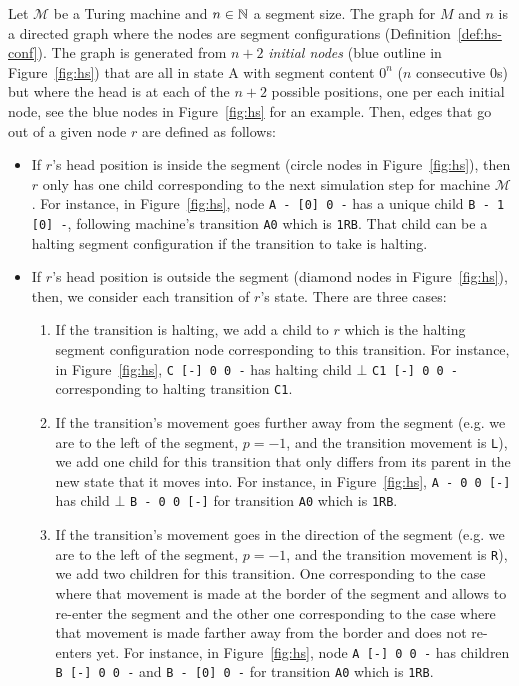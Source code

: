 \begin{definition}[\HS graph]\label{def:hs-graph}\normalfont
  Let $\mathcal{M}$ be a Turing machine and $n \in \mathbb{N}$ a segment size. The \HS graph for $M$ and $n$ is a directed graph where the nodes are segment configurations (Definition~\ref{def:hs-conf}). The graph is generated from $n+2$ \textit{initial nodes} (blue outline in Figure~\ref{fig:hs}) that are all in state A with segment content $0^n$ ($n$ consecutive 0s) but where the head is at each of the $n+2$ possible positions, one per each initial node, see the blue nodes in Figure~\ref{fig:hs} for an example.
  Then, edges that go out of a given node $r$ are defined as follows:
  \begin{itemize}
    \item If $r$'s head position is inside the segment (circle nodes in Figure~\ref{fig:hs}), then $r$ only has one child corresponding to the next simulation step for machine $\mathcal{M}$. For instance, in Figure~\ref{fig:hs}, node \texttt{A - [0] 0 -} has a unique child \texttt{B - 1 [0] -}, following machine's transition \texttt{A0} which is \texttt{1RB}. That child can be a halting segment configuration if the transition to take is halting.
    \item If $r$'s head position is outside the segment (diamond nodes in Figure~\ref{fig:hs}), then, we consider each transition of $r$'s state. There are three cases:
          \begin{enumerate}
            \item If the transition is halting, we add a child to $r$ which is the halting segment configuration node corresponding to this transition. For instance, in Figure~\ref{fig:hs}, \texttt{C [-] 0 0 -} has halting child $\bot$ \texttt{C1 [-] 0 0 -} corresponding to halting transition \texttt{C1}.
            \item If the transition's movement goes further away from the segment (e.g. we are to the left of the segment, $p=-1$, and the transition movement is \texttt{L}), we add one child for this transition that only differs from its parent in the new state that it moves into. For instance, in Figure~\ref{fig:hs}, \texttt{A - 0 0 [-]} has child $\bot$ \texttt{B - 0 0 [-]} for transition \texttt{A0} which is \texttt{1RB}.
            \item If the transition's movement goes in the direction of the segment (e.g. we are to the left of the segment, $p=-1$, and the transition movement is \texttt{R}), we add two children for this transition. One corresponding to the case where that movement is made at the border of the segment and allows to re-enter the segment and the other one corresponding to the case where that movement is made farther away from the border and does not re-enters yet. For instance, in Figure~\ref{fig:hs}, node \texttt{A [-] 0 0 -} has children \texttt{B [-] 0 0 -} and \texttt{B - [0] 0 -} for transition \texttt{A0} which is \texttt{1RB}.
          \end{enumerate}
  \end{itemize}


\end{definition}
